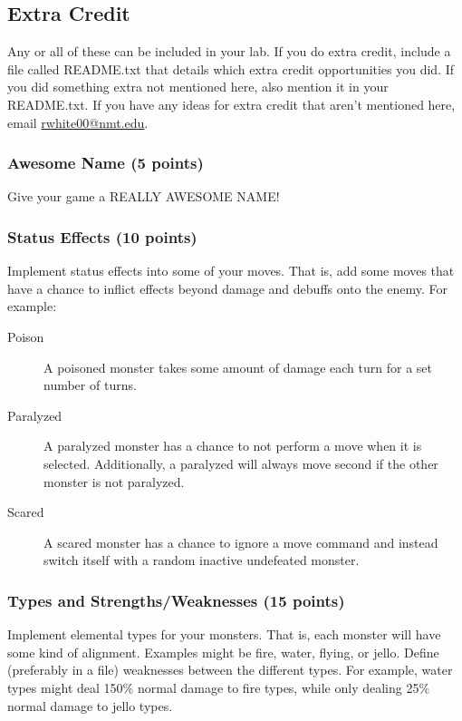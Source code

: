 \documentclass[11pt]{cselabheader}
\begin{document}
\subsection{Extra Credit}
Any or all of these can be included in your lab. If you do extra credit, include a
file called README.txt that details which extra credit opportunities you did. If
you did something extra not mentioned here, also mention it in your README.txt.
If you have any ideas for extra credit that aren't mentioned here, email
\href{mailto:rwhite00@nmt.edu}{rwhite00@nmt.edu}.

\subsubsection{Awesome Name (5 points)}
Give your game a REALLY AWESOME NAME!

\subsubsection{Status Effects (10 points)}
Implement status effects into some of your moves. That is, add some moves that have
a chance to inflict effects beyond damage and debuffs onto the enemy. For example:
\begin{description}
\item[Poison] A poisoned monster takes some amount of damage each turn for a set
  number of turns.
\item[Paralyzed] A paralyzed monster has a chance to not perform a move when it is
  selected. Additionally, a paralyzed will always move second if the other monster
  is not paralyzed.
\item[Scared] A scared monster has a chance to ignore a move command and instead
  switch itself with a random inactive undefeated monster.
\end{description}

\subsubsection{Types and Strengths/Weaknesses (15 points)}
Implement elemental types for your monsters. That is, each monster will have some
kind of alignment. Examples might be fire, water, flying, or jello. Define
(preferably in a file) weaknesses between the different types. For example,
water types might deal 150\% normal damage to fire types, while only dealing
25\% normal damage to jello types.
\end{document}

